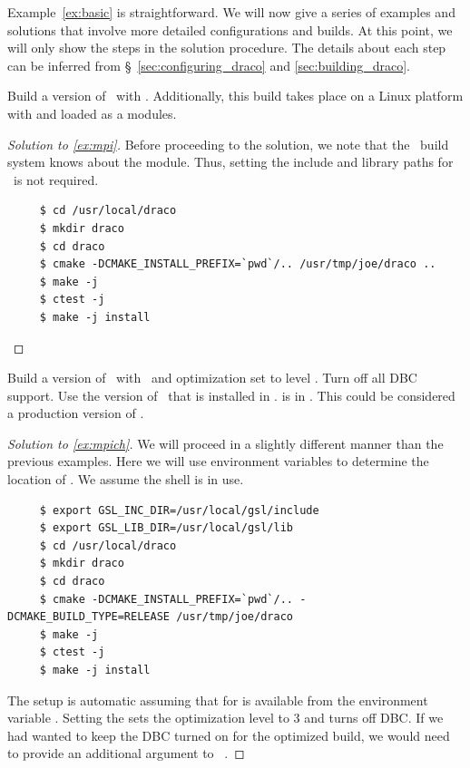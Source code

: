 Example~\ref{ex:basic} is straightforward.  We will now give a series
of examples and solutions that involve more detailed configurations
and builds.  At this point, we will only show the steps in the
solution procedure.  The details about each step can be inferred from
\S~\ref{sec:configuring_draco} and \ref{sec:building_draco}.

\begin{cexa}
  \label{ex:mpi}
  Build a version of \draco\ with \mpi.  Additionally, this build
  takes place on a Linux platform with  and  loaded as a modules.
\end{cexa}
\begin{proof}[Solution to \ref{ex:mpi}]
  Before proceeding to the solution, we note that the \draco\ build
  system knows about the  module.
  Thus, setting the include and library paths for \mpi\ is not
  required.
\begin{verbatim}
     $ cd /usr/local/draco
     $ mkdir draco
     $ cd draco
     $ cmake -DCMAKE_INSTALL_PREFIX=`pwd`/.. /usr/tmp/joe/draco .. 
     $ make -j 
     $ ctest -j
     $ make -j install
\end{verbatim} %
\end{proof}

\begin{cexa}
  \label{ex:mpich}
  Build a version of \draco\ with \mpi\ and optimization set to level
  .  Turn off all DBC support.  Use the  version of
  \mpi\ that is installed in . 
   is in .  This could be considered a production
  version of \draco.
\end{cexa}
\begin{proof}[Solution to \ref{ex:mpich}]
  We will proceed in a slightly different manner than the previous
  examples.  Here we will use environment variables to determine the
  location of .  We assume the  shell is in use.
\begin{verbatim}
     $ export GSL_INC_DIR=/usr/local/gsl/include
     $ export GSL_LIB_DIR=/usr/local/gsl/lib
     $ cd /usr/local/draco
     $ mkdir draco
     $ cd draco
     $ cmake -DCMAKE_INSTALL_PREFIX=`pwd`/.. -DCMAKE_BUILD_TYPE=RELEASE /usr/tmp/joe/draco 
     $ make -j
     $ ctest -j
     $ make -j install
\end{verbatim}
The  setup is automatic assuming that  for  is available from the environment variable .  Setting the  sets the optimization level to 3 and turns off DBC.  If we had wanted to keep the DBC turned on for the optimized build, we would need to provide an additional argument to \cmake\, .
\end{proof}

